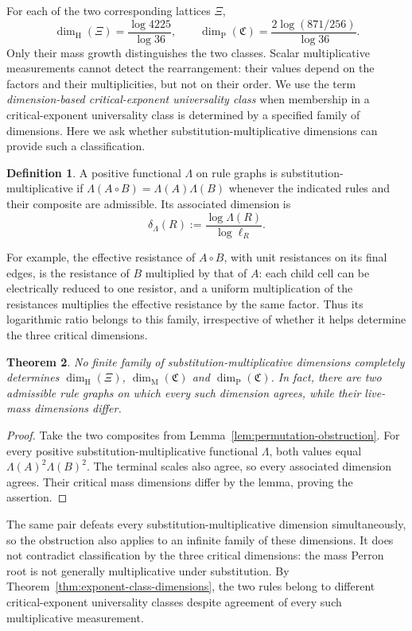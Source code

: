 \documentclass[scheme=plain,11pt]{ctexart}
\newtheorem{theorem}{Theorem}[section]
\theoremstyle{definition}
\newtheorem{definition}[theorem]{Definition}
\theoremstyle{remark}
\newcommand{\dimhaus}{\dim_{\mathrm H}}
\newcommand{\dimmass}{\dim_{\mathrm M}}
\begin{document}
For each of the two corresponding lattices $\Xi$,
\[
 \dimhaus(\Xi)=\frac{\log4225}{\log36},\qquad
 \dim_{\mathrm P}(\mathfrak C)=\frac{2\log(871/256)}{\log36}.
\]
Only their mass growth distinguishes the two classes.
Scalar multiplicative measurements cannot detect the rearrangement: their values depend on the factors and their multiplicities, but not on their order.
We use the term \emph{dimension-based critical-exponent universality class} when membership in a critical-exponent universality class is determined by a specified family of dimensions.
Here we ask whether substitution-multiplicative dimensions can provide such a classification.

\begin{definition}\label{def:multiplicative-dimension}
A positive functional $\Lambda$ on rule graphs is substitution-multiplicative if $\Lambda(A\circ B)=\Lambda(A)\Lambda(B)$ whenever the indicated rules and their composite are admissible. Its associated dimension is
\[
 \delta_\Lambda(R):=\frac{\log\Lambda(R)}{\log\ell_R}.
\]
\end{definition}
For example, the effective resistance of $A\circ B$, with unit resistances on its final edges, is the resistance of $B$ multiplied by that of $A$: each child cell can be electrically reduced to one resistor, and a uniform multiplication of the resistances multiplies the effective resistance by the same factor. Thus its logarithmic ratio belongs to this family, irrespective of whether it helps determine the three critical dimensions.

\begin{theorem}\label{thm:no-multiplicative-classification}
No finite family of substitution-multiplicative dimensions completely determines $\dimhaus(\Xi)$, $\dimmass(\mathfrak C)$ and $\dim_{\mathrm P}(\mathfrak C)$. In fact, there are two admissible rule graphs on which every such dimension agrees, while their live-mass dimensions differ.
\end{theorem}

\begin{proof}
Take the two composites from Lemma~\ref{lem:permutation-obstruction}.
For every positive substitution-multiplicative functional $\Lambda$, both values equal $\Lambda(A)^2\Lambda(B)^2$.
The terminal scales also agree, so every associated dimension agrees.
Their critical mass dimensions differ by the lemma, proving the assertion.
\end{proof}

The same pair defeats every substitution-multiplicative dimension simultaneously, so the obstruction also applies to an infinite family of these dimensions.
It does not contradict classification by the three critical dimensions: the mass Perron root is not generally multiplicative under substitution.
By Theorem~\ref{thm:exponent-class-dimensions}, the two rules belong to different critical-exponent universality classes despite agreement of every such multiplicative measurement.
\end{document}
